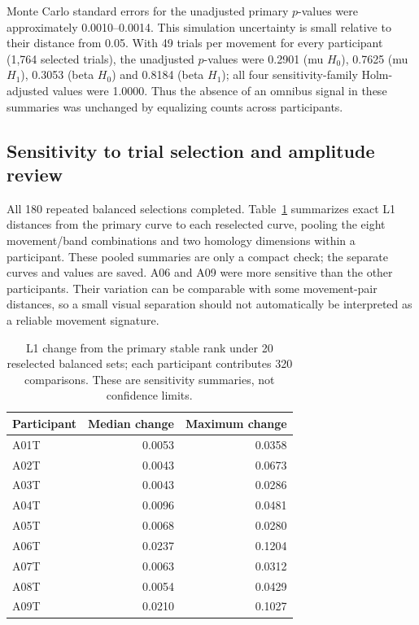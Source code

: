 Monte Carlo standard errors for the unadjusted primary $p$-values were approximately 0.0010--0.0014. This simulation uncertainty is small relative to their distance from 0.05. With 49 trials per movement for every participant (1,764 selected trials), the unadjusted $p$-values were 0.2901 (mu $H_0$), 0.7625 (mu $H_1$), 0.3053 (beta $H_0$) and 0.8184 (beta $H_1$); all four sensitivity-family Holm-adjusted values were 1.0000. Thus the absence of an omnibus signal in these summaries was unchanged by equalizing counts across participants.

\subsection{Sensitivity to trial selection and amplitude review}
All 180 repeated balanced selections completed. Table~\ref{tab:selection} summarizes exact L1 distances from the primary curve to each reselected curve, pooling the eight movement/band combinations and two homology dimensions within a participant. These pooled summaries are only a compact check; the separate curves and values are saved. A06 and A09 were more sensitive than the other participants. Their variation can be comparable with some movement-pair distances, so a small visual separation should not automatically be interpreted as a reliable movement signature.


\begin{table}[htbp]\centering

\caption{L1 change from the primary stable rank under 20 reselected balanced sets; each participant contributes 320 comparisons. These are sensitivity summaries, not confidence limits.}\label{tab:selection}

\begin{tabular}{lrr}\toprule Participant & Median change & Maximum change\\\midrule

A01T & 0.0053 & 0.0358 \\

A02T & 0.0043 & 0.0673 \\

A03T & 0.0043 & 0.0286 \\

A04T & 0.0096 & 0.0481 \\

A05T & 0.0068 & 0.0280 \\

A06T & 0.0237 & 0.1204 \\

A07T & 0.0063 & 0.0312 \\

A08T & 0.0054 & 0.0429 \\

A09T & 0.0210 & 0.1027 \\

\bottomrule\end{tabular}\end{table}

